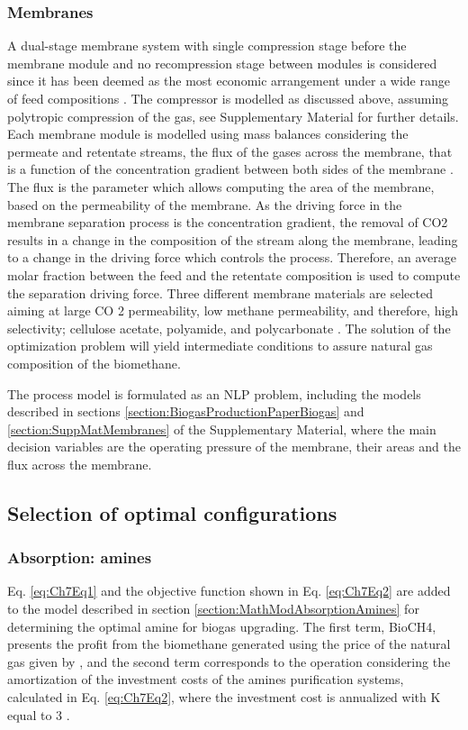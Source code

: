 \begin{refsection}[referencesCh7]
\subsubsection{Membranes} \label{section:MathModMembranes}
A dual-stage membrane system with single compression stage before the membrane module and no recompression stage between modules is considered since it has been deemed as the most economic arrangement under a wide range of feed compositions \citep{kim2017optimization}. The compressor is modelled as discussed above, assuming polytropic compression of the gas, see Supplementary Material for further details. Each membrane module is modelled using mass balances considering the permeate and retentate streams, the flux of the gases across the membrane, that is a function of the concentration gradient between both sides of the membrane \citep{FernandesRodriguesMsc}. The flux is the parameter which allows computing the area of the membrane, based on the permeability of the membrane. As the driving force in the membrane separation process is the concentration gradient, the
removal of CO2 results in a change in the composition of the stream along the membrane, leading to a change in the driving force which controls the process. Therefore, an average molar fraction between the feed and the retentate composition is used to compute the separation driving force. Three different membrane materials are selected aiming at large CO 2 permeability, low methane permeability, and therefore, high selectivity; cellulose acetate, polyamide, and polycarbonate \citep{vrbova2017upgrading}. The solution of the optimization problem will yield intermediate conditions to assure natural gas composition of the biomethane.

The process model is formulated as an NLP problem, including the models described in sections \ref{section:BiogasProductionPaperBiogas} and \ref{section:SuppMatMembranes} of the Supplementary Material, where the main decision variables are the operating pressure of the membrane, their areas and the flux across the membrane.

\subsection{Selection of optimal configurations}
\subsubsection{Absorption: amines}
Eq. \ref{eq:Ch7Eq1} and the objective function shown in Eq. \ref{eq:Ch7Eq2} are added to the model described in section \ref{section:MathModAbsorptionAmines} for determining the optimal amine for biogas upgrading. The first term, BioCH4, presents the profit from the biomethane generated using the price of the natural gas given by \citet{EIAPrices}, and the second term corresponds to the operation considering the amortization of the investment costs of the amines purification systems, calculated in Eq. \ref{eq:Ch7Eq2}, where the investment cost is annualized with K equal to 3 \citep{douglas1988conceptual}.


\end{refsection}

